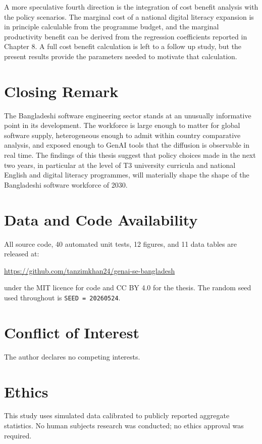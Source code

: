 \documentclass[11pt,a4paper]{report}
\renewcommand{\bibname}{References}
\begin{document}
A more speculative fourth direction is the integration of cost benefit
analysis with the policy scenarios. The marginal cost of a national
digital literacy expansion is in principle calculable from the
\citet{a2iDigitalLiteracy2024} programme budget, and the marginal
productivity benefit can be derived from the regression coefficients
reported in Chapter 8. A full cost benefit calculation is left to a
follow up study, but the present results provide the parameters
needed to motivate that calculation.

\section{Closing Remark}

The Bangladeshi software engineering sector stands at an unusually
informative point in its development. The workforce is large enough to
matter for global software supply, heterogeneous enough to admit
within country comparative analysis, and exposed enough to GenAI tools
that the diffusion is observable in real time. The findings of this
thesis suggest that policy choices made in the next two years, in
particular at the level of T3 university curricula and national
English and digital literacy programmes, will materially shape the
shape of the Bangladeshi software workforce of 2030.

\section*{Data and Code Availability}

All source code, 40 automated unit tests, 12 figures, and 11 data
tables are released at:
\begin{center}
\url{https://github.com/tanzimkhan24/genai-se-bangladesh}
\end{center}
under the MIT licence for code and CC BY 4.0 for the thesis. The
random seed used throughout is \texttt{SEED = 20260524}.

\section*{Conflict of Interest}

The author declares no competing interests.

\section*{Ethics}

This study uses simulated data calibrated to publicly reported
aggregate statistics. No human subjects research was conducted; no
ethics approval was required.

\renewcommand{\bibname}{References}


\end{document}
